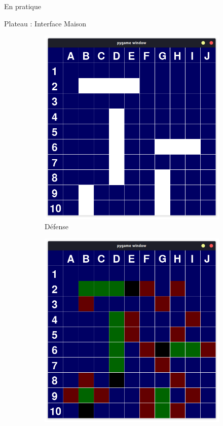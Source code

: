 	\begin{frame}{En pratique}
	    \begin{block}{Plateau : Interface Maison}
	        \begin{figure}
    		    \begin{subfigure}{.48\textwidth}
        		    \centering
        		    \includegraphics[width=.9\linewidth]{images/defense.png}
                    \caption*{Défense}
                    \label{fig:plateaudefense}
                \end{subfigure}
                \begin{subfigure}{.48\textwidth}
                    \centering
                    \includegraphics[width=.9\linewidth]{images/attaque.png}

\end{subfigure}
\end{figure}
\end{block}
\end{frame}
